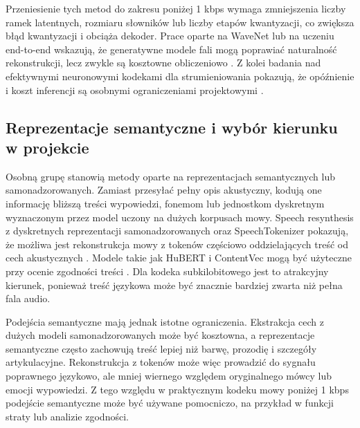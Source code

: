 Przeniesienie tych metod do zakresu poniżej 1 kbps wymaga zmniejszenia liczby ramek latentnych, rozmiaru słowników lub liczby etapów kwantyzacji, co zwiększa błąd kwantyzacji i obciąża dekoder. Prace oparte na WaveNet lub na uczeniu end-to-end wskazują, że generatywne modele fali mogą poprawiać naturalność rekonstrukcji, lecz zwykle są kosztowne obliczeniowo \cite{Kleijn2018WaveNetLowRate,Kankanahalli2018EndToEndSpeechCoding,VanDenOord2016WaveNet}. Z kolei badania nad efektywnymi neuronowymi kodekami dla strumieniowania pokazują, że opóźnienie i koszt inferencji są osobnymi ograniczeniami projektowymi \cite{Morrison2022EfficientNeuralAudioCodecs}.

\subsection{Reprezentacje semantyczne i wybór kierunku w projekcie}
\label{subsec:reprezentacje-semantyczne-wybor-kierunku}

Osobną grupę stanowią metody oparte na reprezentacjach semantycznych lub samonadzorowanych. Zamiast przesyłać pełny opis akustyczny, kodują one informację bliższą treści wypowiedzi, fonemom lub jednostkom dyskretnym wyznaczonym przez model uczony na dużych korpusach mowy. Speech resynthesis z dyskretnych reprezentacji samonadzorowanych oraz SpeechTokenizer pokazują, że możliwa jest rekonstrukcja mowy z tokenów częściowo oddzielających treść od cech akustycznych \cite{Polyak2021SpeechResynthesis,Zhang2023SpeechTokenizer}. Modele takie jak HuBERT i ContentVec mogą być użyteczne przy ocenie zgodności treści \cite{Hsu2021HuBERT,Qian2022ContentVec}. Dla kodeka subkilobitowego jest to atrakcyjny kierunek, ponieważ treść językowa może być znacznie bardziej zwarta niż pełna fala audio.

Podejścia semantyczne mają jednak istotne ograniczenia. Ekstrakcja cech z dużych modeli samonadzorowanych może być kosztowna, a reprezentacje semantyczne często zachowują treść lepiej niż barwę, prozodię i szczegóły artykulacyjne. Rekonstrukcja z tokenów może więc prowadzić do sygnału poprawnego językowo, ale mniej wiernego względem oryginalnego mówcy lub emocji wypowiedzi. Z tego względu w praktycznym kodeku mowy poniżej 1 kbps podejście semantyczne może być używane pomocniczo, na przykład w funkcji straty lub analizie zgodności.


